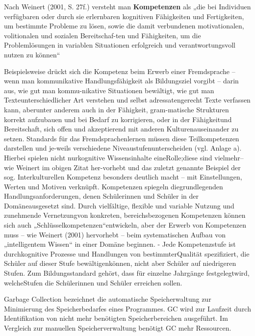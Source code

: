 \documentclass[
12pt,
english,
ngerman,
headsepline,
twoside,
openright,
numbers=noenddot,version=first
]{scrreprt}
\begin{document}
Nach Weinert (2001, S. 27f.) versteht man \textbf{Kompetenzen} als „die bei Individuen verfügbaren oder durch sie erlernbaren kognitiven Fähigkeiten und Fertigkeiten, um bestimmte Probleme zu lösen, sowie die damit verbundenen motivationalen, volitionalen und sozialen Bereitschaf-ten und Fähigkeiten, um die Problemlösungen in variablen Situationen erfolgreich und verantwortungsvoll nutzen zu können“

Beispielsweise drückt sich die Kompetenz beim Erwerb einer Fremdsprache – wenn man kommunikative Handlungsfähigkeit als Bildungsziel vorgibt – darin aus, wie gut man kommu-nikative Situationen bewältigt, wie gut man Texteunterschiedlicher Art verstehen und selbst adressatengerecht Texte verfassen kann, aberunter anderem auch in der Fähigkeit, gram-matische Strukturen korrekt aufzubauen und bei Bedarf zu korrigieren, oder in der Fähigkeitund Bereitschaft, sich offen und akzeptierend mit anderen Kulturenauseinander zu setzen. Standards für das Fremdsprachenlernen müssen diese Teilkompetenzen darstellen und je-weils verschiedene Niveaustufenunterscheiden (vgl. Anlage a). Hierbei spielen nicht nurkognitive Wissensinhalte eineRolle;diese sind vielmehr– wie Weinert im obigen Zitat her-vorhebt und das zuletzt genannte Beispiel der sog. Interkulturellen Kompetenz besonders deutlich macht – mit Einstellungen, Werten und Motiven verknüpft.
Kompetenzen spiegeln diegrundlegenden Handlungsanforderungen, denen Schülerinnen und Schüler in der Domäneausgesetzt sind. Durch vielfältige, flexible und variable Nutzung und zunehmende Vernetzungvon konkreten, bereichsbezogenen Kompetenzen können sich auch „Schlüsselkompetenzen“entwickeln, aber der Erwerb von Kompetenzen muss – wie Weinert (2001) hervorhebt – beim systematischen Aufbau von „intelligentem Wissen“ in einer Domäne beginnen.
- Jede Kompetenzstufe ist durchkognitive Prozesse und Handlungen von bestimmterQualität spezifiziert, die Schüler auf dieser Stufe bewältigenkönnen, nicht aber Schüler auf niedrigeren Stufen. Zum Bildungsstandard gehört, dass für einzelne Jahrgänge festgelegtwird, welcheStufen die Schülerinnen und Schüler erreichen sollen.
\begin{acronym}[Bash]



\glqq Garbage Collection\grqq{} bezeichnet die automatische Speicherwaltung zur Minimierung des Speicherbedarfes eines Programmes.
\ac{GC} wird zur Laufzeit durch Identifikation von nicht mehr benötigten Speicherbereichen ausgeführt.
Im Vergleich zur manuellen Speicherverwaltung benötigt \ac{GC} mehr Ressourcen.

\end{acronym}
\end{document}
